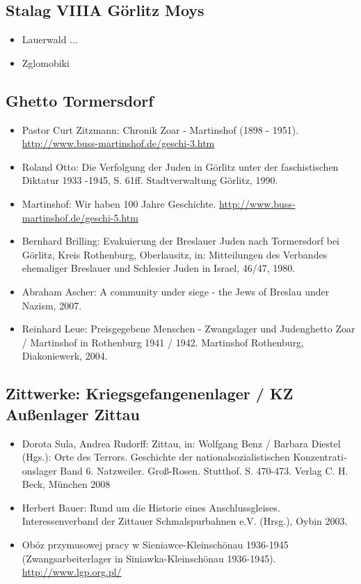 \subsection{Stalag VIIIA Görlitz Moys}
\begin{itemize}
	\item Lauerwald ...
	\item Zglomobiki
\end{itemize}

\subsection{Ghetto Tormersdorf}
\begin{itemize}
	\item Pastor Curt Zitzmann: Chronik Zoar - Martinshof (1898 - 1951). \url{http://www.buss-martinshof.de/geschi-3.htm}
	\item Roland Otto: Die Verfolgung der Juden in Görlitz unter der faschistischen Diktatur 1933 -1945, S. 61ff. Stadtverwaltung Görlitz, 1990.
	\item Martinshof: Wir haben 100 Jahre Geschichte. \url{http://www.buss-martinshof.de/geschi-5.htm}
	\item Bernhard Brilling: Evakuierung der Breslauer Juden nach Tormersdorf bei Görlitz, Kreis Rothenburg, Oberlausitz, in: Mitteilungen des Verbandes ehemaliger Breslauer und Schlesier Juden in Israel, 46/47, 1980. 
	\item Abraham Ascher: A community under siege - the Jews of Breslau under Nazism, 2007.
	\item Reinhard Leue: Preisgegebene Menschen - Zwangslager und Judenghetto Zoar / Martinshof in Rothenburg 1941 / 1942. Martinshof Rothenburg, Diakoniewerk, 2004.
\end{itemize}

\subsection{Zittwerke: Kriegsgefangenenlager / KZ Außenlager Zittau}
\begin{itemize}
\item Dorota Sula, Andrea Rudorff: Zittau, in: Wolf­gang Benz / Bar­bara Die­s­tel (Hgs.): Orte des Ter­rors. Ge­schichte der na­tio­nal­so­zia­lis­ti­schen Kon­zen­tra­ti­onsla­ger Band 6. Natz­wei­ler. Groß-Rosen. Stutt­hof. S. 470-473.  Ver­lag C. H. Beck, München 2008
\item Herbert Bauer: Rund um die Historie eines Anschlussgleises. Interessenverband der Zittauer Schmalspurbahnen e.V. (Hrsg.), Oybin 2003.
\item Obóz przymusowej pracy w Sieniawce-Kleinschönau 1936-1945 (Zwangsarbeiterlager in Siniawka-Kleinschönau 1936-1945). \url{http://www.lgp.org.pl/}
\end{itemize}
